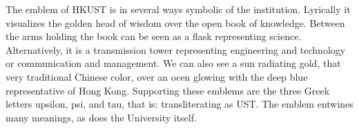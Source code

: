 The emblem of HKUST is in several ways symbolic of the institution. Lyrically it visualizes the golden head of wisdom over the open book of knowledge. Between the arms holding the book can be seen as a flask representing science. Alternatively, it is a transmission tower representing engineering and technology or communication and management. We can also see a sun radiating gold, that very traditional Chinese color, over an ocen glowing with the deep blue representative of Hong Kong. Supporting these emblems are the three Greek letters upsilon, psi, and tau, that is: transliterating as UST. The emblem entwines many meanings, as does the University itself.

